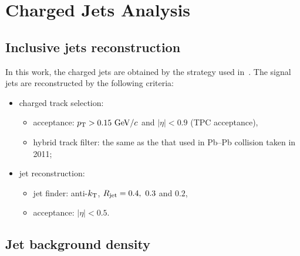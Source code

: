 \section{Charged Jets Analysis}

\subsection{Inclusive jets reconstruction}

In this work, the charged jets are obtained by the strategy used
in~\cite{Ali2013:ana933}.
The signal jets are reconstructed by the following criteria:
\begin{itemize}
\item charged track selection:
      \begin{itemize}
      \item acceptance: $p_{\rm T}>0.15~{\rm GeV}/c$ and $|\eta|<0.9$ (TPC acceptance),
      \item hybrid track filter: the same as the that used in Pb--Pb
            collision taken in 2011;
      \end{itemize}
\item jet reconstruction:
      \begin{itemize}
      \item jet finder: anti-$k_{\rm T}$, $R_{\rm jet}=0.4,~0.3$ and $0.2$,
      \item acceptance: $|\eta|<0.5$.
      \end{itemize}
\end{itemize}

\subsection{Jet background density}

